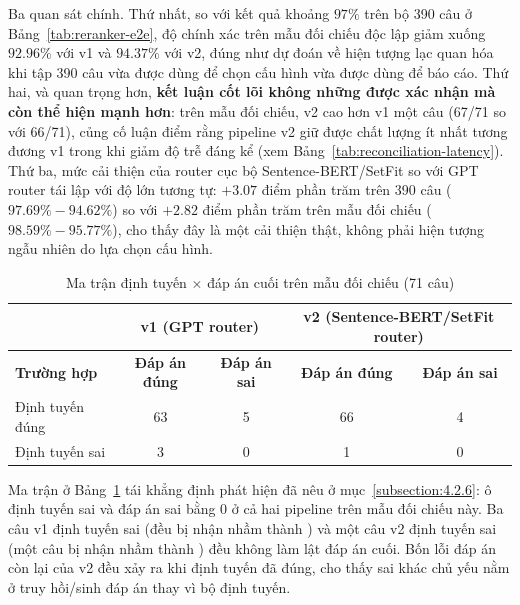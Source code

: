 \documentclass[../DoAn.tex]{subfiles}
\begin{document}
Ba quan sát chính. Thứ nhất, so với kết quả khoảng $97\%$ trên bộ 390 câu ở Bảng~\ref{tab:reranker-e2e}, độ chính xác trên mẫu đối chiếu độc lập giảm xuống $92.96\%$ với v1 và $94.37\%$ với v2, đúng như dự đoán về hiện tượng lạc quan hóa khi tập 390 câu vừa được dùng để chọn cấu hình vừa được dùng để báo cáo. Thứ hai, và quan trọng hơn, \textbf{kết luận cốt lõi không những được xác nhận mà còn thể hiện mạnh hơn}: trên mẫu đối chiếu, v2 cao hơn v1 một câu (67/71 so với 66/71), củng cố luận điểm rằng pipeline v2 giữ được chất lượng ít nhất tương đương v1 trong khi giảm độ trễ đáng kể (xem Bảng~\ref{tab:reconciliation-latency}). Thứ ba, mức cải thiện của router cục bộ Sentence-BERT/SetFit so với GPT router tái lập với độ lớn tương tự: $+3.07$ điểm phần trăm trên 390 câu ($97.69\%-94.62\%$) so với $+2.82$ điểm phần trăm trên mẫu đối chiếu ($98.59\%-95.77\%$), cho thấy đây là một cải thiện thật, không phải hiện tượng ngẫu nhiên do lựa chọn cấu hình.

\begin{table}[H]
    \centering
    \caption{Ma trận định tuyến $\times$ đáp án cuối trên mẫu đối chiếu (71 câu)}
    \label{tab:reconciliation-confusion}
    {\small
    \setlength{\tabcolsep}{5pt}
    \begin{tabular}{|>{\raggedright\arraybackslash}p{3.0cm}|c|c|c|c|}
        \hline
        & \multicolumn{2}{c|}{\textbf{v1 (GPT router)}} & \multicolumn{2}{c|}{\textbf{v2 (Sentence-BERT/SetFit router)}} \\ \cline{2-5}
        \textbf{Trường hợp} & \textbf{Đáp án đúng} & \textbf{Đáp án sai} & \textbf{Đáp án đúng} & \textbf{Đáp án sai} \\ \hline
        Định tuyến đúng & 63 & 5 & 66 & 4 \\ \hline
        Định tuyến sai & 3 & 0 & 1 & 0 \\ \hline
    \end{tabular}
    }
\end{table}

Ma trận ở Bảng~\ref{tab:reconciliation-confusion} tái khẳng định phát hiện đã nêu ở mục~\ref{subsection:4.2.6}: ô định tuyến sai và đáp án sai bằng 0 ở cả hai pipeline trên mẫu đối chiếu này. Ba câu v1 định tuyến sai (đều  bị nhận nhầm thành ) và một câu v2 định tuyến sai (một câu  bị nhận nhầm thành ) đều không làm lật đáp án cuối. Bốn lỗi đáp án còn lại của v2 đều xảy ra khi định tuyến đã đúng, cho thấy sai khác chủ yếu nằm ở truy hồi/sinh đáp án thay vì bộ định tuyến.
\end{document}
